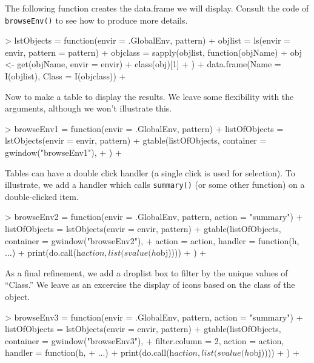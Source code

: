 \documentclass[12pt]{article}
\newcommand{\RFunc}[1]{\texttt{#1()}}
\begin{document}
The following function creates the data.frame we will display. Consult the code
of \RFunc{browseEnv} to see how to produce more details.

\begin{Schunk}
\begin{Sinput}
> lstObjects = function(envir = .GlobalEnv, pattern) {
+     objlist = ls(envir = envir, pattern = pattern)
+     objclass = sapply(objlist, function(objName) {
+         obj <- get(objName, envir = envir)
+         class(obj)[1]
+     })
+     data.frame(Name = I(objlist), Class = I(objclass))
+ }
\end{Sinput}
\end{Schunk}

Now to make a table to display the results. We leave some flexibility
with the arguments, although we won't illustrate this.


\begin{Schunk}
\begin{Sinput}
> browseEnv1 = function(envir = .GlobalEnv, pattern) {
+     listOfObjects = lstObjects(envir = envir, pattern)
+     gtable(listOfObjects, container = gwindow("browseEnv1"), 
+         )
+ }
\end{Sinput}
\end{Schunk}

Tables can have a double click handler (a single click is used for
selection). To illustrate, we  add a handler which 
calls \RFunc{summary} (or some other function) on a double-clicked item.

\begin{Schunk}
\begin{Sinput}
> browseEnv2 = function(envir = .GlobalEnv, pattern, action = "summary") {
+     listOfObjects = lstObjects(envir = envir, pattern)
+     gtable(listOfObjects, container = gwindow("browseEnv2"), 
+         action = action, handler = function(h, ...) {
+             print(do.call(h$action, list(svalue(h$obj))))
+         })
+ }
\end{Sinput}
\end{Schunk}

As a final refinement, we  add a droplist box to filter by the unique
values of ``Class.'' We leave as an excercise the display of icons
based on the class of the object.
\begin{Schunk}
\begin{Sinput}
> browseEnv3 = function(envir = .GlobalEnv, pattern, action = "summary") {
+     listOfObjects = lstObjects(envir = envir, pattern)
+     gtable(listOfObjects, container = gwindow("browseEnv3"), 
+         filter.column = 2, action = action, handler = function(h, 
+             ...) {
+             print(do.call(h$action, list(svalue(h$obj))))
+         })
+ }
\end{Sinput}
\end{Schunk}
\end{document}
